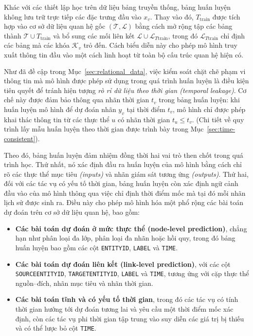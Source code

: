 Khác với các thiết lập học trên dữ liệu bảng truyền thống, bảng huấn luyện không lưu trữ trực tiếp các đặc trưng đầu vào $x_v$. Thay vào đó, $T_{\text{train}}$ được tích hợp vào cơ sở dữ liệu quan hệ gốc $(\mathcal{T}, \mathcal{L})$ bằng cách mở rộng tập các bảng thành $\mathcal{T} \cup {T_{\text{train}}}$ và bổ sung các mối liên kết $\mathcal{L} \cup \mathcal{L}_{T{\text{train}}}$, trong đó $\mathcal{L}_{T{\text{train}}}$ chỉ định các bảng mà các khóa $\mathcal{K}_v$ trỏ đến. Cách biểu diễn này cho phép mô hình truy xuất thông tin đầu vào một cách linh hoạt từ toàn bộ cấu trúc quan hệ hiện có.

Như đã đề cập trong Mục~\ref{sec:relational_data}, việc kiểm soát chặt chẽ phạm vi thông tin mà mô hình được phép sử dụng trong quá trình huấn luyện là điều kiện tiên quyết để tránh hiện tượng \textit{rò rỉ dữ liệu theo thời gian (temporal leakage)}. Cơ chế này được đảm bảo thông qua nhãn thời gian $t_v$ trong bảng huấn luyện: khi huấn luyện mô hình để dự đoán nhãn $y_v$ tại thời điểm $t_v$, mô hình chỉ được phép khai thác thông tin từ các thực thể $u$ có nhãn thời gian $t_u \leq t_v$. (Chi tiết về quy trình lấy mẫu huấn luyện theo thời gian được trình bày trong Mục~\ref{sec:time-consistent}).

Theo đó, bảng huấn luyện đảm nhiệm đồng thời hai vai trò then chốt trong quá trình học. Thứ nhất, nó xác định đầu ra huấn luyện của mô hình bằng cách chỉ rõ các thực thể mục tiêu \textit{(inputs)} và nhãn giám sát tương ứng \textit{(outputs)}. Thứ hai, đối với các tác vụ có yếu tố thời gian, bảng huấn luyện còn xác định ngữ cảnh đầu vào của mô hình thông qua việc chỉ định thời điểm mốc mà tại đó mỗi nhãn lịch sử được sinh ra. Điều này cho phép mô hình hóa một phổ rộng các bài toán dự đoán trên cơ sở dữ liệu quan hệ, bao gồm:
\begin{itemize}
\item \textbf{Các bài toán dự đoán ở mức thực thể (node-level prediction)}, chẳng hạn như phân loại đa lớp, phân loại đa nhãn hoặc hồi quy, trong đó bảng huấn luyện bao gồm các cột \texttt{ENTITYID}, \texttt{LABEL} và \texttt{TIME}.
\item \textbf{Các bài toán dự đoán liên kết (link-level prediction)}, với các cột \texttt{SOURCEENTITYID}, \texttt{TARGETENTITYID}, \texttt{LABEL} và \texttt{TIME}, tương ứng với cặp thực thể nguồn–đích, nhãn mục tiêu và nhãn thời gian.
\item \textbf{Các bài toán tĩnh và có yếu tố thời gian}, trong đó các tác vụ có tính thời gian hướng tới dự đoán tương lai và yêu cầu một thời điểm mốc xác định, còn các tác vụ phi thời gian tập trung vào suy diễn các giá trị bị thiếu và có thể lược bỏ cột \texttt{TIME}.
\end{itemize}

